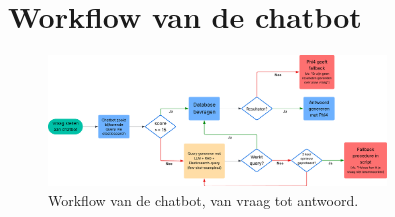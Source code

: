 \section{Workflow van de chatbot}
\begin{figure}[H]
    \centering
    \includegraphics[width=0.8\textwidth]{./img/chatbot_workflow.png}
    \caption[Workflow van de chatbot]{\label{fig:chatbot_workflow}Workflow van de chatbot, van vraag tot antwoord.}
\end{figure}

